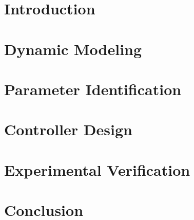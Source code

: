 \documentclass[12pt,twoside]{report}
\begin{document}

\thispagestyle{empty}



%

\tableofcontents

\cleardoublepage

\cleardoublepage







\chapter{Introduction}

\cleardoublepage

\chapter{Dynamic Modeling}

\cleardoublepage

\chapter{Parameter Identification}

\cleardoublepage


\chapter{Controller Design}

\cleardoublepage


\chapter{Experimental Verification}

\cleardoublepage

\chapter{Conclusion}

\cleardoublepage

%
\end{document}
